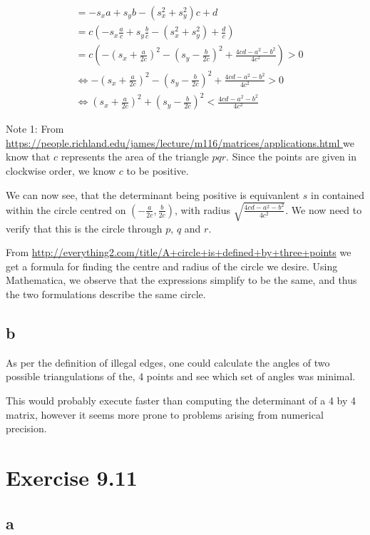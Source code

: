 \documentclass[11pt,a4paper]{article}
\begin{document}
\begin{align}
    &= - s_x a + s_y b - (s_x^2+s_y^2) c + d \\
    &= c (- s_x \frac{a}{c} + s_y \frac{b}{c} - (s_x^2+s_y^2) + \frac{d}{c})\\
    &= c (- (s_x + \frac{a}{2c})^2 - (s_y - \frac{b}{2c})^2 + \frac{4cd-a^2-b^2}{4c^2}) > 0 \\
    &\Leftrightarrow - (s_x + \frac{a}{2c})^2 - (s_y - \frac{b}{2c})^2 + \frac{4cd-a^2-b^2}{4c^2} > 0 \tag{Since c > 0, see note 1.} \\ 
    &\Leftrightarrow (s_x + \frac{a}{2c})^2 + (s_y - \frac{b}{2c})^2 < \frac{4cd-a^2-b^2}{4c^2}
\end{align}

Note 1: From
\url{https://people.richland.edu/james/lecture/m116/matrices/applications.html
} we know that $c$ represents the area of the triangle $pqr$. Since the points
are given in clockwise order, we know $c$ to be positive.

We can now see, that the determinant being positive is equivanlent $s$ in
contained within the circle centred on $(-\frac{a}{2c}, \frac{b}{2c})$, with
radius $\sqrt{\frac{4cd-a^2-b^2}{4c^2}}$. We now need to verify that this is
the circle through $p$, $q$ and $r$.

From \url{http://everything2.com/title/A+circle+is+defined+by+three+points} we
get a formula for finding the centre and radius of the circle we desire. Using
Mathematica, we observe that the expressions simplify to be the same, and thus
the two formulations describe the same circle.

\subsection{b}
As per the definition of illegal edges, one could calculate the angles of
two possible triangulations of the, 4 points and see which set of angles was
minimal.

This would probably execute faster than computing the determinant of a 4 by
4 matrix, however it seems more prone to problems arising from numerical
precision.

\section{Exercise 9.11}
\subsection{a}
\end{document}
